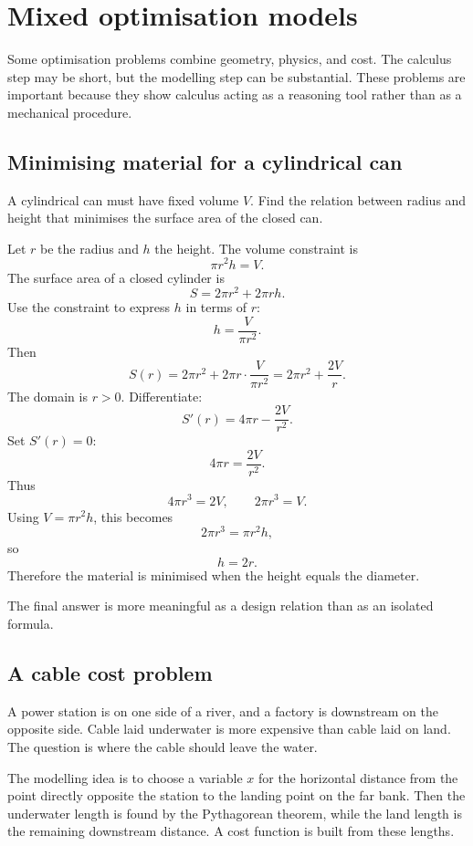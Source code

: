 \section{Mixed optimisation models}

Some optimisation problems combine geometry, physics, and cost. The calculus step may be short, but the modelling step can be substantial. These problems are important because they show calculus acting as a reasoning tool rather than as a mechanical procedure.

\subsection*{Minimising material for a cylindrical can}

\begin{examplebox}
A cylindrical can must have fixed volume \(V\). Find the relation between radius and height that minimises the surface area of the closed can.

Let \(r\) be the radius and \(h\) the height. The volume constraint is
\[
\pi r^2h=V.
\]
The surface area of a closed cylinder is
\[
S=2\pi r^2+2\pi rh.
\]
Use the constraint to express \(h\) in terms of \(r\):
\[
h=\frac{V}{\pi r^2}.
\]
Then
\[
S(r)=2\pi r^2+2\pi r\cdot\frac{V}{\pi r^2}
=2\pi r^2+\frac{2V}{r}.
\]
The domain is \(r>0\). Differentiate:
\[
S'(r)=4\pi r-\frac{2V}{r^2}.
\]
Set \(S'(r)=0\):
\[
4\pi r=\frac{2V}{r^2}.
\]
Thus
\[
4\pi r^3=2V,
\qquad
2\pi r^3=V.
\]
Using \(V=\pi r^2h\), this becomes
\[
2\pi r^3=\pi r^2h,
\]
so
\[
h=2r.
\]
Therefore the material is minimised when the height equals the diameter.
\end{examplebox}

The final answer is more meaningful as a design relation than as an isolated formula.

\subsection*{A cable cost problem}

A power station is on one side of a river, and a factory is downstream on the opposite side. Cable laid underwater is more expensive than cable laid on land. The question is where the cable should leave the water.

The modelling idea is to choose a variable \(x\) for the horizontal distance from the point directly opposite the station to the landing point on the far bank. Then the underwater length is found by the Pythagorean theorem, while the land length is the remaining downstream distance. A cost function is built from these lengths.

